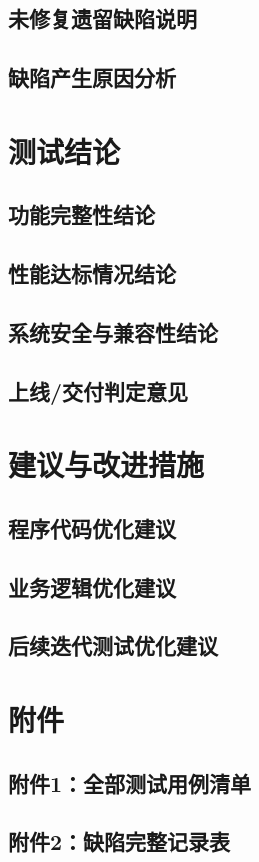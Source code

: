\documentclass{../template/softeng}
\begin{document}
\subsection{未修复遗留缺陷说明}
\subsection{缺陷产生原因分析}

\section{测试结论}
\subsection{功能完整性结论}
\subsection{性能达标情况结论}
\subsection{系统安全与兼容性结论}
\subsection{上线/交付判定意见}

\section{建议与改进措施}
\subsection{程序代码优化建议}
\subsection{业务逻辑优化建议}
\subsection{后续迭代测试优化建议}

\section{附件}
\subsection{附件1：全部测试用例清单}
\subsection{附件2：缺陷完整记录表}
\end{document}
